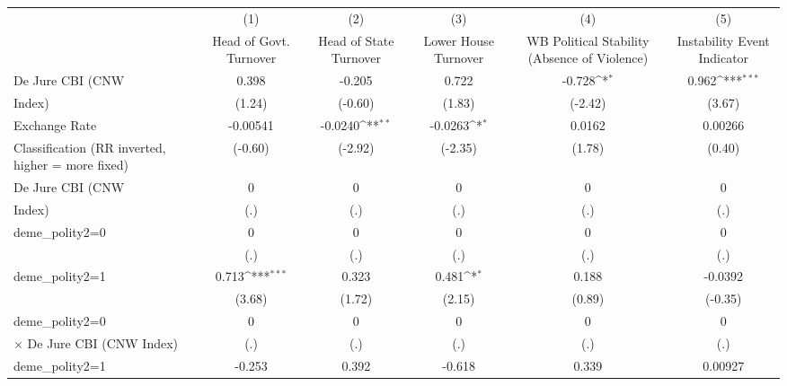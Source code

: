 {
\def\sym#1{\ifmmode^{#1}\else\(^{#1}\)\fi}
\begin{tabular}{l*{5}{c}}
\toprule
                &\multicolumn{1}{c}{(1)}&\multicolumn{1}{c}{(2)}&\multicolumn{1}{c}{(3)}&\multicolumn{1}{c}{(4)}&\multicolumn{1}{c}{(5)}\\
                &\multicolumn{1}{c}{Head of Govt. Turnover}&\multicolumn{1}{c}{Head of State Turnover}&\multicolumn{1}{c}{Lower House Turnover}&\multicolumn{1}{c}{WB Political Stability (Absence of Violence)}&\multicolumn{1}{c}{Instability Event Indicator}\\
\midrule
De Jure CBI (CNW&    0.398         &   -0.205         &    0.722         &   -0.728\sym{*}  &    0.962\sym{***}\\
Index)          &   (1.24)         &  (-0.60)         &   (1.83)         &  (-2.42)         &   (3.67)         \\
\addlinespace
Exchange Rate   & -0.00541         &  -0.0240\sym{**} &  -0.0263\sym{*}  &   0.0162         &  0.00266         \\
Classification (RR inverted, higher = more fixed)&  (-0.60)         &  (-2.92)         &  (-2.35)         &   (1.78)         &   (0.40)         \\
\addlinespace
De Jure CBI (CNW&        0         &        0         &        0         &        0         &        0         \\
Index)          &      (.)         &      (.)         &      (.)         &      (.)         &      (.)         \\
\addlinespace
deme\_polity2=0  &        0         &        0         &        0         &        0         &        0         \\
                &      (.)         &      (.)         &      (.)         &      (.)         &      (.)         \\
\addlinespace
deme\_polity2=1  &    0.713\sym{***}&    0.323         &    0.481\sym{*}  &    0.188         &  -0.0392         \\
                &   (3.68)         &   (1.72)         &   (2.15)         &   (0.89)         &  (-0.35)         \\
\addlinespace
deme\_polity2=0  &        0         &        0         &        0         &        0         &        0         \\
$\times$ De Jure CBI (CNW Index)&      (.)         &      (.)         &      (.)         &      (.)         &      (.)         \\
\addlinespace
deme\_polity2=1  &   -0.253         &    0.392         &   -0.618         &    0.339         &  0.00927         \\

\end{tabular}}
